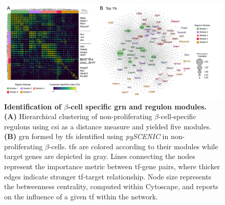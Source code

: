 \vspace{-10pt}
\begin{figure}[H]
\centering
\includegraphics[width=\linewidth]{Chapter5/Fig/F3-10-02.png}
\caption[Identification of $\beta$-cell specific  and regulon modules]{\textbf{Identification of $\beta$-cell specific \gls{grn} and regulon modules.} \textbf{(A)} Hierarchical clustering of non-proliferating $\beta$-cell-specific regulons using \gls{csi} as a distance measure and yielded five modules. \textbf{(B)} \gls{grn} formed by \glspl{tf} identified using \textit{pySCENIC} in non-proliferating $\beta$-cells. \glspl{tf} are colored according to their modules while target genes are depicted in gray. Lines connecting the nodes represent the importance metric between \gls{tf}-gene pairs, where thicker edges indicate stronger \gls{tf}-target relationship. Node size represents the betweenness centrality, computed within Cytoscape, and reports on the influence of a given \gls{tf} within the network.}
\label{fig:chp3_scenic_betaonly}
\end{figure}





